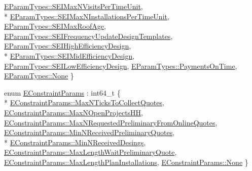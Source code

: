 \begin{DoxyCompactItemize}
\hyperlink{namespacesolar__core_aa1147341e5ef7a40d68d1bd68e149362ad6e334fa57e5846cf4ba4b182dadca1d}{E\+Param\+Types\+::\+S\+E\+I\+Max\+N\+Visits\+Per\+Time\+Unit}, 
\\*
\hyperlink{namespacesolar__core_aa1147341e5ef7a40d68d1bd68e149362acd42418f4ce0736c05d2aa8b36694774}{E\+Param\+Types\+::\+S\+E\+I\+Max\+N\+Installations\+Per\+Time\+Unit}, 
\hyperlink{namespacesolar__core_aa1147341e5ef7a40d68d1bd68e149362a79d36b9c925b7e55309fd4436f67c4ee}{E\+Param\+Types\+::\+S\+E\+I\+Max\+Roof\+Age}, 
\hyperlink{namespacesolar__core_aa1147341e5ef7a40d68d1bd68e149362ae48d553d39bcd7d207890c610fa1e74c}{E\+Param\+Types\+::\+S\+E\+I\+Frequency\+Update\+Design\+Templates}, 
\hyperlink{namespacesolar__core_aa1147341e5ef7a40d68d1bd68e149362ad03dae753c26cb012acd3a7dcd41dc8c}{E\+Param\+Types\+::\+S\+E\+I\+High\+Efficiency\+Design}, 
\\*
\hyperlink{namespacesolar__core_aa1147341e5ef7a40d68d1bd68e149362a2b4390775acd3d31e3049d242a1dd196}{E\+Param\+Types\+::\+S\+E\+I\+Mid\+Efficiency\+Design}, 
\hyperlink{namespacesolar__core_aa1147341e5ef7a40d68d1bd68e149362ab2592ca389b1a29cf91ddefe8d6769a2}{E\+Param\+Types\+::\+S\+E\+I\+Low\+Efficiency\+Design}, 
\hyperlink{namespacesolar__core_aa1147341e5ef7a40d68d1bd68e149362a7863d48ef49981916e8a483f2171b306}{E\+Param\+Types\+::\+Payments\+On\+Time}, 
\hyperlink{namespacesolar__core_aa1147341e5ef7a40d68d1bd68e149362a6adf97f83acf6453d4a6a4b1070f3754}{E\+Param\+Types\+::\+None}
 \}
\item 
enum \hyperlink{namespacesolar__core_ac827fdef4412a3c0d5e44d3f31908e49}{E\+Constraint\+Params} \+: int64\+\_\+t \{ \\*
\hyperlink{namespacesolar__core_ac827fdef4412a3c0d5e44d3f31908e49a79b059203dc39b55d85046f355d1fa95}{E\+Constraint\+Params\+::\+Max\+N\+Ticks\+To\+Collect\+Quotes}, 
\hyperlink{namespacesolar__core_ac827fdef4412a3c0d5e44d3f31908e49a5d0891420ec7c6769c9ece305c98daac}{E\+Constraint\+Params\+::\+Max\+N\+Open\+Projects\+H\+H}, 
\hyperlink{namespacesolar__core_ac827fdef4412a3c0d5e44d3f31908e49ae497930a8f22e14387bac31ebe737a64}{E\+Constraint\+Params\+::\+Max\+N\+Requested\+Preliminary\+From\+Online\+Quotes}, 
\hyperlink{namespacesolar__core_ac827fdef4412a3c0d5e44d3f31908e49a2e66c9bd577b41e92fd40c619a886559}{E\+Constraint\+Params\+::\+Min\+N\+Received\+Preliminary\+Quotes}, 
\\*
\hyperlink{namespacesolar__core_ac827fdef4412a3c0d5e44d3f31908e49a177186685b2d9651d26b48cb4ad61cc6}{E\+Constraint\+Params\+::\+Min\+N\+Received\+Desings}, 
\hyperlink{namespacesolar__core_ac827fdef4412a3c0d5e44d3f31908e49aa27f1df5083a611e423ed8531aad5cd3}{E\+Constraint\+Params\+::\+Max\+Length\+Wait\+Preliminary\+Quote}, 
\hyperlink{namespacesolar__core_ac827fdef4412a3c0d5e44d3f31908e49a343e282b2f49a70e6df068f1bca38402}{E\+Constraint\+Params\+::\+Max\+Length\+Plan\+Installations}, 
\hyperlink{namespacesolar__core_ac827fdef4412a3c0d5e44d3f31908e49a6adf97f83acf6453d4a6a4b1070f3754}{E\+Constraint\+Params\+::\+None}
 \}
\end{DoxyCompactItemize}
